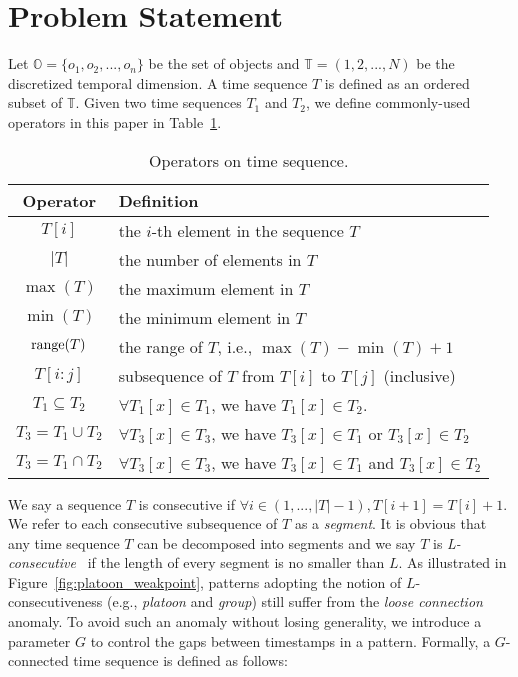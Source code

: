 \section{Problem Statement}
\label{sec:definition}
Let $\mathbb{O} = \{o_1 ,o_2,...,o_n\}$ be the set of objects and $\mathbb{T} =(1,2,...,N)$ be the discretized temporal dimension. A time sequence $T$ is defined as an ordered subset of $\mathbb{T}$. Given two time sequences $T_1$ and $T_2$, we define commonly-used operators in this paper in Table~\ref{tbl:operators}.

\begin{table}[h]
\vspace{-2mm}
\centering
\begin{tabular}{|c|p{6.5cm}|}
\hline 
\textbf{Operator} & \textbf{Definition} \\ 
\hline
$T[i]$ & the $i$-th element in the sequence $T$ \\ 
\hline
$|T|$ & the number of elements in $T$\\
\hline
$\max(T)$ & the maximum element in $T$\\
\hline
$\min(T)$ & the minimum element in $T$\\
\hline
$\operatorname*{range}(T)$ & the range of $T$, i.e., $\max(T) - \min(T) +1$\\ 
\hline 
$T[i:j]$ & subsequence of $T$ from $T[i]$ to $T[j]$ (inclusive) \\ 
\hline
$T_1\subseteq T_2$ &  $\forall T_1[x]\in T_1$, we have $T_1[x]\in T_2$. \\\hline
$T_3=T_1\cup T_2$ & $\forall T_3[x]\in T_3$, we have $T_3[x]\in T_1$ or $T_3[x] \in T_2$\\ 
\hline
$T_3=T_1\cap T_2$ & $\forall T_3[x]\in T_3$, we have $T_3[x]\in T_1$ and $T_3[x] \in T_2$\\ 
\hline
\end{tabular}
\vspace{-0.5em}
\caption{Operators on time sequence.} \label{tbl:operators}
\end{table} 

We say a sequence $T$ is consecutive 
if $\forall i \in (1,...,|T|-1), T[i+1] = T[i] + 1$.  We refer to each consecutive subsequence of $T$ as a \emph{segment}.
It is obvious that any time sequence $T$ can be decomposed into
segments and we say $T$ is \textit{L-consecutive}~\cite{li2015platoon} 
if the length of every segment is no smaller than $L$. As illustrated in Figure~\ref{fig:platoon_weakpoint}, patterns adopting the notion of $L$-consecutiveness (e.g., \emph{platoon} and \emph{group}) still suffer from the \emph{loose connection} anomaly. 
To avoid such an anomaly without losing generality, we introduce a parameter $G$ to control the gaps between
timestamps in a pattern. Formally, a $G$-connected time sequence is defined as follows:


